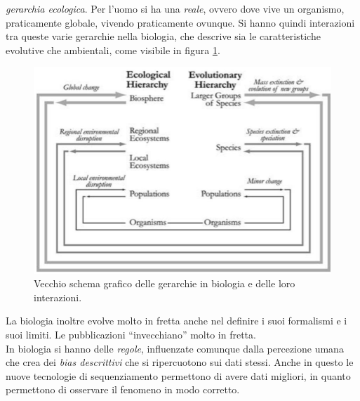 \documentclass[a4paper,12pt, oneside]{book}
\begin{document}
\textit{gerarchia ecologica}. Per l'uomo si
ha una \textit{reale}, ovvero dove vive un organismo, praticamente globale,
vivendo praticamente ovunque. Si hanno quindi interazioni tra queste varie
gerarchie nella biologia, che descrive sia le caratteristiche evolutive che
ambientali, come visibile in figura \ref{fig:ger}. \\
\begin{figure}
  \centering
  \includegraphics[scale = 0.4]{img/ger.jpg}
  \caption{Vecchio schema grafico delle gerarchie in biologia e delle loro
    interazioni.}
  \label{fig:ger}
\end{figure}
La biologia inoltre evolve molto in fretta anche nel definire i suoi formalismi
e i suoi limiti. Le pubblicazioni ``invecchiano'' molto in fretta.\\
In biologia si hanno delle \textit{regole}, influenzate comunque dalla
percezione umana che crea dei \textit{bias descrittivi} che si ripercuotono sui
dati stessi. Anche in questo le nuove tecnologie di sequenziamento permettono di
avere dati migliori, in quanto permettono di osservare il fenomeno in modo
corretto. 
\end{document}
